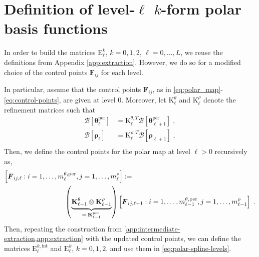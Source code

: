 \documentclass[10pt]{article}
\newcommand{\mbf}[1]{{\boldsymbol{#1}}}
\newcommand{\basis}[1]{\mathcal{#1}}
\newcommand{\mat}[1]{\mbf{\mathrm{#1}}}
\newcommand{\cU}{\theta}
\newcommand{\cV}{\rho}
\newcommand{\kntU}{\cU}
\newcommand{\kntV}{\cV}
\newcommand{\kntsU}{\mbf{\kntU}}
\newcommand{\kntsV}{\mbf{\kntV}}
\newcommand{\pkntsU}{\kntsU^\per}
\newcommand{\ndofV}{m^\cV}
\newcommand{\bsp}{B}
\newcommand{\bspB}{\basis{\bsp}}
\newcommand{\per}{\mathrm{per}}
\newcommand{\pndofU}{m^{\cU,\per}}
\newcommand{\tint}{\mathrm{int}}
\theoremstyle{plain}
\theoremstyle{definition}
\theoremstyle{remark}
\begin{document}
\section{Definition of level-$\ell$ $k$-form polar basis functions}\label{app:extraction-refinement}

In order to build the matrices $\mat{E}^k_\ell$, $k = 0, 1, 2$, $\ell = 0, \dots, L$, we reuse the definitions from Appendix \ref{app:extraction}.
However, we do so for a modified choice of the control points $\mbf{F}_{ij}$ for each level.

In particular, assume that the control points $\mbf{F}_{ij}$, as in \eqref{eq:polar_map}-\eqref{eq:control-points}, are given at level $0$.
Moreover, let $\mat{K}_{\ell}^\cU$ and $\mat{K}_{\ell}^\cV$ denote the refinement matrices such that
\begin{equation}
    \begin{split}
        \bspB[\pkntsU_\ell] &= \mat{K}_{\ell}^{\cU,T} \bspB[\pkntsU_{\ell+1}]\;,\\
        \bspB[\kntsV_\ell] &= \mat{K}_{\ell}^{\cV,T} \bspB[\kntsV_{\ell+1}]\;,\\
    \end{split}
\end{equation}
Then, we define the control points for the polar map at level $\ell > 0$ recursively as,
\begin{equation}\label{eq:control-point-refinement}
    \begin{split}
        \left[\mbf{F}_{ij,\ell} : i = 1, \dots, \pndofU_{\ell}, j = 1, \dots, \ndofV_\ell\right] 
    &:=\\
    &\hspace*{-3cm}\left(
        \underbrace{\mat{K}_{\ell-1}^{\cU} \otimes \mat{K}_{\ell-1}^{\cV}}_{ =: \mat{K}^{\per}_{\ell-1}}
    \right)
    \left[\mbf{F}_{ij,\ell-1} : i = 1, \dots, \pndofU_{\ell-1}, j = 1, \dots, \ndofV_{\ell-1}\right] \;.
    \end{split}
\end{equation}
Then, repeating the construction from \cref{app:intermediate-extraction,app:extraction} with the updated control points, we can define the matrices $\mat{E}^{k,\tint}_{\ell}$ and $\mat{E}^k_{\ell}$, $k = 0, 1, 2$, and use them in \eqref{eq:polar-spline-levels}.



\end{document}
